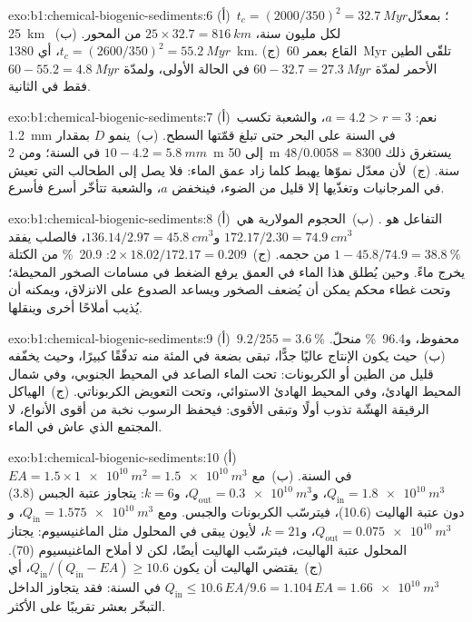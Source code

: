 \begin{solution}{exo:b1:chemical-biogenic-sediments:6}
(أ)~$t_c = (2000/350)^2 = \qty{32.7}{Myr}$؛ بمعدّل \qty{25}{km} لكل مليون سنة، $25\times32.7 = \qty{816}{km}$ من المحور. (ب)~$t_c = (2600/350)^2 =
\qty{55.2}{Myr}$، أي \qty{1380}{km}. (ج)~القاع بعمر \qty{60}{Myr} تلقّى الطين الأحمر لمدّة $60 - 32.7 = \qty{27.3}{Myr}$ في الحالة الأولى، ولمدّة $60 - 55.2 = \qty{4.8}{Myr}$ فقط في الثانية.
\end{solution}

\begin{solution}{exo:b1:chemical-biogenic-sediments:7}
(أ)~نعم: $a = 4.2 > r = 3$، والشعبة تكسب \qty{1.2}{mm} في السنة على البحر حتى تبلغ قمّتها السطح. (ب)~ينمو $D$ بمقدار $10 - 4.2 = \qty{5.8}{mm}$ في السنة؛ ومن \qty{2}{m} إلى \qty{50}{m} يستغرق ذلك $48/0.0058 = \num{8300}$ سنة. (ج)~لأن معدّل نموّها يهبط كلما زاد عمق الماء: فلا يصل إلى الطحالب التي تعيش في المرجانيات وتغذّيها إلا قليل من الضوء، فينخفض $a$، والشعبة تتأخّر أسرع فأسرع.
\end{solution}

\begin{solution}{exo:b1:chemical-biogenic-sediments:8}
(أ)~التفاعل هو . (ب)~الحجوم المولارية هي $172.17/2.30 =
\qty{74.9}{cm^3}$ و$136.14/2.97 = \qty{45.8}{cm^3}$، فالصلب يفقد $1 - 45.8/74.9 = \qty{38.8}{\%}$ من حجمه. (ج)~$2\times18.02/172.17 = 0.209$: \qty{20.9}{\%} من الكتلة يخرج ماءً. وحين يُطلق هذا الماء في العمق يرفع الضغط في مسامات الصخور المحيطة؛ وتحت غطاء محكم يمكن أن يُضعف الصخور ويساعد الصدوع على الانزلاق، ويمكنه أن يُذيب أملاحًا أخرى وينقلها.
\end{solution}

\begin{solution}{exo:b1:chemical-biogenic-sediments:9}
(أ)~$9.2/255 = \qty{3.6}{\%}$ محفوظ، و\qty{96.4}{\%} منحلّ. (ب)~حيث يكون الإنتاج عاليًا جدًّا، تبقى بضعة في المئة منه تدفّقًا كبيرًا، وحيث يخفّفه قليل من الطين أو الكربونات: تحت الماء الصاعد في المحيط الجنوبي، وفي شمال المحيط الهادئ، وفي المحيط الهادئ الاستوائي، وتحت التعويض الكربوناتي. (ج)~الهياكل الرقيقة الهشّة تذوب أولًا وتبقى الأقوى: فيحفظ الرسوب نخبة من أقوى الأنواع، لا المجتمع الذي عاش في الماء.
\end{solution}

\begin{solution}{exo:b1:chemical-biogenic-sediments:10}
(أ)~$EA = 1.5\times\qty{1e10}{m^2} = \qty{1.5e10}{m^3}$ في السنة. (ب)~مع $Q_{\mathrm{in}} = \qty{1.8e10}{m^3}$، و$Q_{\mathrm{out}} = \qty{0.3e10}{m^3}$، و$k = 6$: يتجاوز عتبة الجبس (3.8) دون عتبة الهاليت (10.6)، فيترسّب الكربونات والجبس. ومع $Q_{\mathrm{in}} =
\qty{1.575e10}{m^3}$، و$Q_{\mathrm{out}} = \qty{0.075e10}{m^3}$، و$k = 21$، لأيون يبقى في المحلول مثل الماغنيسيوم: يجتاز المحلول عتبة الهاليت، فيترسّب الهاليت أيضًا، لكن لا أملاح الماغنيسيوم (70). (ج)~يقتضي الهاليت أن يكون $Q_{\mathrm{in}}/(Q_{\mathrm{in}} - EA) \ge 10.6$، أي $Q_{\mathrm{in}} \le 10.6\,EA/9.6 = 1.104\,EA = \qty{1.66e10}{m^3}$ في السنة: فقد يتجاوز الداخل التبخّر بعشر تقريبًا على الأكثر.
\end{solution}


